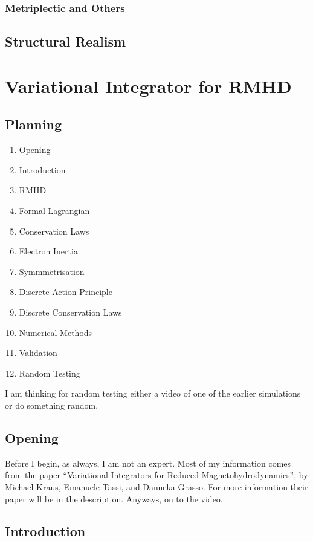 \subsubsection{Metriplectic and Others}

\subsection{Structural Realism}
\section{Variational Integrator for RMHD}

\subsection{Planning}
\begin{enumerate}
  \item Opening
  \item Introduction
  \item RMHD
  \item Formal Lagrangian
  \item Conservation Laws
  \item Electron Inertia
  \item Symmmetrisation
  \item Discrete Action Principle
  \item Discrete Conservation Laws
  \item Numerical Methods
  \item Validation
  \item Random Testing
\end{enumerate}

I am thinking for random testing either a video of one of the earlier simulations or do something random.


\subsection{Opening}

Before I begin, as always, I am not an expert. Most of my information comes from the paper ``Variational Integrators for Reduced Magnetohydrodynamics'', by Michael Kraus, Emanuele Tassi, and Danueka Grasso. For more information their paper will be in the description. Anyways, on to the video.

\subsection{Introduction}

